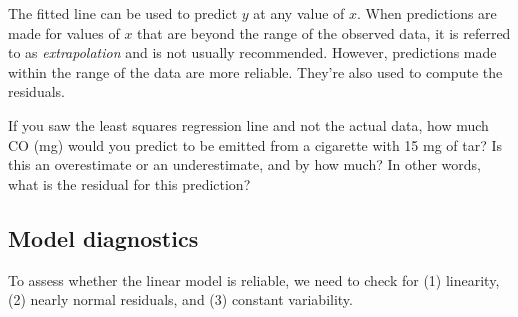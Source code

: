 \documentclass{article}\usepackage[]{graphicx}\usepackage[]{color}
\begin{document}
The fitted line can be used to predict $y$ at any value of $x$.  When predictions are made for values of $x$ that are beyond the range of the observed data, it is referred to as \emph{extrapolation} and is not usually recommended.  However, predictions made within the range of the data are more reliable.  They're also used to compute the residuals.

\begin{exercise}
If you saw the least squares regression line and not the actual data, how much CO (mg) would you predict to be emitted from a cigarette with 15 mg of tar? Is this an overestimate or an underestimate, and by how much? In other words, what is the residual for this prediction?
\end{exercise}

\subsection*{Model diagnostics}

To assess whether the linear model is reliable, we need to check for  (1) linearity, (2) nearly normal residuals, and (3) constant variability.
\end{document}
